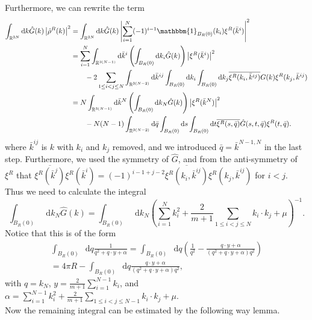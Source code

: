 \documentclass[a4paper,11pt]{article}
\newcommand{\abs}[1]{\left\lvert #1 \right\rvert}
\newcommand*\diff{\mathop{}\!\mathrm{d}}
\newcommand{\R}{\mathbb{R}}
\numberwithin{equation}{section}
\begin{document}
Furthermore, we can rewrite the term\begin{equation}\label{QuadraticFormTerm3}
\begin{aligned}
\int_{\R^{3N}}\diff k\hat{G}(k)\abs{\hat{\rho}^R(k)}^2&=\int_{\R^{3N}}\diff k\hat{G}(k)\left\lvert\sum_{i=1}^{N}(-1)^{i-1}\mathbbm{1}_{B_R(0)}(k_i)\xi^R(\bar{k}^i)\right\rvert^2\\
	&=\sum_{i=1}^{N}\int_{\R^{3(N-1)}}\diff \bar{k}^i\left(\int_{B_R(0)}\diff k_i \hat{G}(k)\right)\abs{\xi^R(\bar{k}^i)}^2\\&\qquad-2\sum_{1\leq i<j\leq N}\int_{\R^{3(N-2)}}\diff \bar{k}^{ij}\int_{B_R(0)}\diff k_i\int_{B_R(0)}\diff k_j\overline{\xi^R(k_i,\bar{k}^{ij})}G(k)\xi^R(k_j,\bar{k}^{ij})\\&=N\int_{\R^{3(N-1)}}\diff \bar{k}^N\left(\int_{B_R(0)}\diff k_N \hat{G}(k)\right)\abs{\xi^R(\bar{k}^N)}^2\\&\qquad-N(N-1)\int_{\R^{3(N-2)}}\diff \bar{q}\int_{B_R(0)}\diff s\int_{B_R(0)}\diff t \overline{\xi^R(s,\bar{q})}\hat{G}(s,t,\bar{q})\xi^R(t,\bar{q}).
\end{aligned}
\end{equation}
where $ \bar{k}^{ij} $ is $ k $ with $ k_i $ and $ k_j $ removed, and we introduced $ \bar{q}=\bar{k}^{N-1,N} $ in the last step. Furthermore, we used the symmetry of $ \hat{G} $, and from the anti-symmetry of $ \xi^R $ that $ \overline{\xi^R(\bar{k}^j)}\xi^R(\bar{k}^i)=(-1)^{i-1+j-2}\overline{\xi^R(k_i,\bar{k}^{ij})}\xi^R(k_j,\bar{k}^{ij}) $ for $ i<j $. Thus we need to calculate the integral \begin{equation}
\int_{B_R(0)} \diff k_N \hat{G}(k)=\int_{B_R(0)} \diff k_N \left(\sum_{i=1}^{N}k_i^2+\frac{2}{m+1}\sum_{1\leq i<j\leq N}k_i\cdot k_j+\mu\right)^{-1}.
\end{equation}
Notice that this is of the form \begin{equation}
\begin{aligned}
\int_{B_R(0)} \diff q \frac{1}{q^2+q\cdot y+\alpha}= \int_{B_R(0)} \diff q\left( \frac{1}{q^2}-\frac{q\cdot y+\alpha}{(q^2+q\cdot y+\alpha)q^2}\right)\\=4\pi R-\int_{B_R(0)} \diff q\frac{q\cdot y+\alpha}{(q^2+q\cdot y+\alpha)q^2},
\end{aligned}
\end{equation}
with $ q=k_N $, $ y=\frac{2}{m+1}\sum_{i=1}^{N-1}k_i $, and $ \alpha=\sum_{i=1}^{N-1}k_i^2+\frac{2}{m+1}\sum_{1\leq i<j\leq N-1}k_i\cdot k_j+\mu $.\\ Now the remaining integral can be estimated by the following way lemma.
\end{document}

